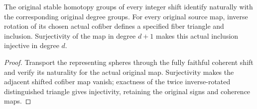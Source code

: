 \begin{proposition}
  \label{prop:actual-stable-shift-and-chosen-fiber}
  \leanok
  The original stable homotopy groups of every integer shift identify naturally with the corresponding original degree groups. For every original source map, inverse rotation of its chosen actual cofiber defines a specified fiber triangle and inclusion. Surjectivity of the map in degree $d+1$ makes this actual inclusion injective in degree $d$.
\end{proposition}
\begin{proof}
  Transport the representing spheres through the fully faithful coherent shift and verify its naturality for the actual original map. Surjectivity makes the adjacent shifted cofiber map vanish; exactness of the twice inverse-rotated distinguished triangle gives injectivity, retaining the original signs and coherence maps.
  \leanok
\end{proof}

